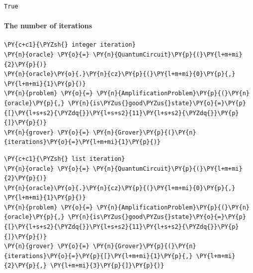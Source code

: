     \begin{Verbatim}[commandchars=\\\{\}]
True
    \end{Verbatim}

    \hypertarget{the-number-of-iterations}{%
\paragraph{The number of iterations}\label{the-number-of-iterations}}

    \begin{tcolorbox}[breakable, size=fbox, boxrule=1pt, pad at break*=1mm,colback=cellbackground, colframe=cellborder]
\begin{Verbatim}[commandchars=\\\{\}]
\PY{c+c1}{\PYZsh{} integer iteration}
\PY{n}{oracle} \PY{o}{=} \PY{n}{QuantumCircuit}\PY{p}{(}\PY{l+m+mi}{2}\PY{p}{)}
\PY{n}{oracle}\PY{o}{.}\PY{n}{cz}\PY{p}{(}\PY{l+m+mi}{0}\PY{p}{,} \PY{l+m+mi}{1}\PY{p}{)}
\PY{n}{problem} \PY{o}{=} \PY{n}{AmplificationProblem}\PY{p}{(}\PY{n}{oracle}\PY{p}{,} \PY{n}{is\PYZus{}good\PYZus{}state}\PY{o}{=}\PY{p}{[}\PY{l+s+s2}{\PYZdq{}}\PY{l+s+s2}{11}\PY{l+s+s2}{\PYZdq{}}\PY{p}{]}\PY{p}{)}
\PY{n}{grover} \PY{o}{=} \PY{n}{Grover}\PY{p}{(}\PY{n}{iterations}\PY{o}{=}\PY{l+m+mi}{1}\PY{p}{)}
\end{Verbatim}
\end{tcolorbox}

    \begin{tcolorbox}[breakable, size=fbox, boxrule=1pt, pad at break*=1mm,colback=cellbackground, colframe=cellborder]
\begin{Verbatim}[commandchars=\\\{\}]
\PY{c+c1}{\PYZsh{} list iteration}
\PY{n}{oracle} \PY{o}{=} \PY{n}{QuantumCircuit}\PY{p}{(}\PY{l+m+mi}{2}\PY{p}{)}
\PY{n}{oracle}\PY{o}{.}\PY{n}{cz}\PY{p}{(}\PY{l+m+mi}{0}\PY{p}{,} \PY{l+m+mi}{1}\PY{p}{)}
\PY{n}{problem} \PY{o}{=} \PY{n}{AmplificationProblem}\PY{p}{(}\PY{n}{oracle}\PY{p}{,} \PY{n}{is\PYZus{}good\PYZus{}state}\PY{o}{=}\PY{p}{[}\PY{l+s+s2}{\PYZdq{}}\PY{l+s+s2}{11}\PY{l+s+s2}{\PYZdq{}}\PY{p}{]}\PY{p}{)}
\PY{n}{grover} \PY{o}{=} \PY{n}{Grover}\PY{p}{(}\PY{n}{iterations}\PY{o}{=}\PY{p}{[}\PY{l+m+mi}{1}\PY{p}{,} \PY{l+m+mi}{2}\PY{p}{,} \PY{l+m+mi}{3}\PY{p}{]}\PY{p}{)}
\end{Verbatim}
\end{tcolorbox}

